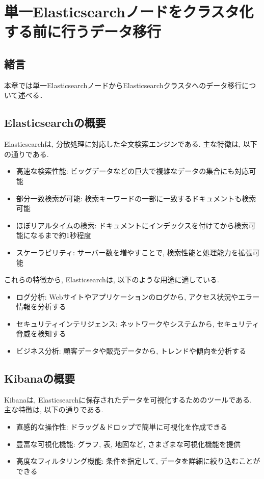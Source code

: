 
\chapter{単一Elasticsearchノードをクラスタ化する前に行うデータ移行}
\label{chap:third}

\section{緒言}
本章では単一ElasticsearchノードからElasticsearchクラスタへのデータ移行について述べる．

\section{Elasticsearchの概要}
Elasticsearchは, 分散処理に対応した全文検索エンジンである. 主な特徴は, 以下の通りである.

\begin{itemize}
  \item 高速な検索性能: ビッグデータなどの巨大で複雑なデータの集合にも対応可能
  \item 部分一致検索が可能: 検索キーワードの一部に一致するドキュメントも検索可能
  \item ほぼリアルタイムの検索: ドキュメントにインデックスを付けてから検索可能になるまで約1秒程度
  \item スケーラビリティ: サーバー数を増やすことで, 検索性能と処理能力を拡張可能
\end{itemize}

これらの特徴から, Elasticsearchは, 以下のような用途に適している.

\begin{itemize}
  \item ログ分析: Webサイトやアプリケーションのログから, アクセス状況やエラー情報を分析する
  \item セキュリティインテリジェンス: ネットワークやシステムから, セキュリティ脅威を検知する
  \item ビジネス分析: 顧客データや販売データから, トレンドや傾向を分析する
\end{itemize}

\section{Kibanaの概要}

Kibanaは, Elasticsearchに保存されたデータを可視化するためのツールである. 主な特徴は, 以下の通りである.

\begin{itemize}
  \item 直感的な操作性: ドラッグ＆ドロップで簡単に可視化を作成できる
  \item 豊富な可視化機能: グラフ, 表, 地図など, さまざまな可視化機能を提供
  \item 高度なフィルタリング機能: 条件を指定して, データを詳細に絞り込むことができる
\end{itemize}

